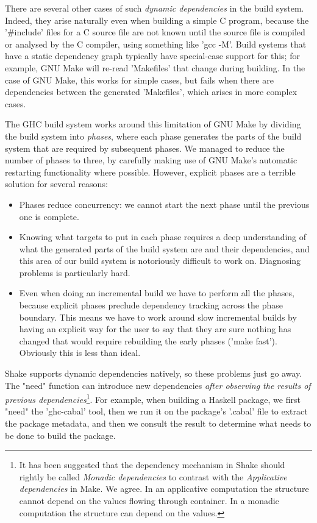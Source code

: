 There are several other cases of such \emph{dynamic dependencies} in the build
system. Indeed, they arise naturally even when building a simple C program,
because the \lst'#include' files for a C source file are not known until the
source file is compiled or analysed by the C compiler, using something like
\lst'gcc -M'. Build systems that have a static dependency graph typically have
special-case support for this; for example, GNU Make will re-read
\lst'Makefiles' that change during building.  In the case of GNU Make,
this works for simple cases, but fails when there are dependencies
between the generated \lst'Makefiles', which arises in more complex cases.

The GHC build system works around this limitation of GNU Make by
dividing the build system into \emph{phases}, where each phase
generates the parts of the build system that are required by
subsequent phases. We managed to reduce the number of phases to
three, by carefully making use of GNU Make's automatic restarting
functionality where possible. However, explicit phases are a terrible
solution for several reasons:

\begin{itemize}
\item Phases reduce concurrency: we cannot start the next phase until
  the previous one is complete.
\item Knowing what targets to put in each phase requires a deep
  understanding of what the generated parts of the build system are
  and their dependencies, and this area of our build system is
  notoriously difficult to work on.  Diagnosing problems is
  particularly hard.
\item Even when doing an incremental build we have to perform all the
  phases, because explicit phases preclude dependency tracking across
  the phase boundary.  This means we have to work around slow
  incremental builds by having an explicit way for the user to say
  that they are sure nothing has changed that would require rebuilding
  the early phases (\lst'make fast').  Obviously this is less than
  ideal.
\end{itemize}

Shake supports dynamic dependencies natively, so these problems just
go away.  The \lst"need" function can introduce new dependencies
\emph{after observing the results of previous dependencies}\footnote{It has been
suggested that the dependency mechanism in Shake should rightly be called
\emph{Monadic dependencies} to contrast with the \emph{Applicative dependencies}
in Make. We agree. In an applicative computation the structure cannot depend on
the values flowing through container. In a monadic computation the structure can
depend on the values.}. For example, when building a Haskell package, we first
\lst"need" the \lst'ghc-cabal' tool, then we run it on the package's \lst'.cabal' file to
extract the package metadata, and then we consult the result to determine what
needs to be done to build the package.

